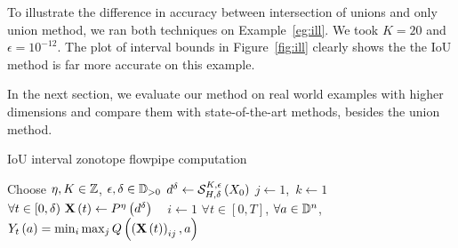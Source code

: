 

\begin{example}
To illustrate the difference in accuracy between intersection of
unions and only union method, we ran both techniques on
Example~\ref{eg:ill}.  We took $K=20$ and $\epsilon = 10^{-12}$.  The
plot of interval bounds in Figure~\ref{fig:ill} clearly shows the the
IoU method is far more accurate on this example.  
\end{example}
In the next section,
we evaluate our method on real world examples with higher dimensions
and compare them with state-of-the-art methods, besides the union
method.
%
\begin{algorithm}
\caption{IoU interval zonotope
flowpipe computation}\label{alg:main}
\DontPrintSemicolon
{}


Choose $\eta,K\in\mathbb{Z}$, $\epsilon,\delta\in\mathbb{D}_{>0}$\;
$d^\delta \gets \mathcal{S}_{H,\delta}^{K,\epsilon}\left(X_0\right)$\;
$j\gets 1$,~$k\gets 1$\;~\label{algstep:assign1}
$\forall t\in[0,\delta)~\mathbf{X}\left(t\right)\gets P^{\eta}\left(d^\delta\right)$\; ~\label{algstep:assign2}
$i\gets 1$\;
\While{$i\delta\leq N$}{
\For{ $j\in \rows{\iouopt{\eta}{X_0}}$ \text{and} $k\in\cols{\iouopt{\eta}{X_0}}$~(in parallel)}{
$\rb{\tr{X}{i\delta}}_{jk} \gets \flow{H}{\delta}{K}{\epsilon}{\rb{\tr{X}{(i-1)\delta}}_{jk}}$~\label{step:1}
}
$\tr{X}{i\delta} \gets \refine\rb{\tr{X}{(i)\delta}}$\;
$\forall t\in[0,t)~\tr{X}{t} \gets \tr{X}{(i)\delta}$\; ~\label{step:2}
$i \gets i+1$\;
}
$\forall t\in[0,T]$, $\forall a\in\mathbb{D}^n$, $Y_{t}\left(a\right)
= \min_i\max_jQ\left(\left(\mathbf{X}\left(t\right)\right)_{ij},a\right)$~\label{step:proj}
\end{algorithm}
%
